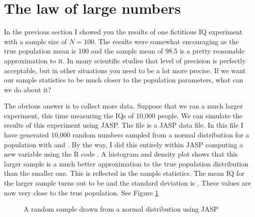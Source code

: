 \section{The law of large numbers~\label{sec:lawlargenumbers}}

In the previous section I showed you the results of one fictitious IQ experiment with a sample size of $N=100$. The results were somewhat encouraging as the true population mean is 100 and the sample mean of 98.5 is a pretty reasonable approximation to it. In many scientific studies that level of precision is perfectly acceptable, but in other situations you need to be a lot more precise. If we want our sample statistics to be much closer to the population parameters, what can we do about it?

The obvious answer is to collect more data. Suppose that we ran a much larger experiment, this time measuring the IQs of 10,000 people. We can simulate the results of this experiment using JASP. The  file is a JASP data file. In this file I have generated 10,000 random numbers sampled from a normal distribution for a population with  and . By the way, I did this entirely within JASP computing a new variable using the R code . A histogram and density plot shows that this larger sample is a much better approximation to the true population distribution than the smaller one. This is reflected in the sample statistics. The mean IQ for the larger sample turns out to be  and the standard deviation is . These values are now very close to the true population. See Figure \ref{fig:iqsim}

\begin{figure}[p]
\begin{center}
\end{center}
\caption{A random sample drawn from a normal distribution using JASP}
\label{fig:iqsim}
\HR
\end{figure}

